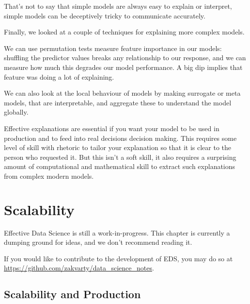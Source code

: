 \documentclass[
  letterpaper,
  DIV=11,
  numbers=noendperiod]{scrreprt}
\begin{document}
That's not to say that simple models are always easy to explain or
interpret, simple models can be deceptively tricky to communicate
accurately.

Finally, we looked at a couple of techniques for explaining more complex
models.

We can use permutation tests measure feature importance in our models:
shuffling the predictor values breaks any relationship to our response,
and we can measure how much this degrades our model performance. A big
dip implies that feature was doing a lot of explaining.

We can also look at the local behaviour of models by making surrogate or
meta models, that are interpretable, and aggregate these to understand
the model globally.

Effective explanations are essential if you want your model to be used
in production and to feed into real decisions decision making. This
requires some level of skill with rhetoric to tailor your explanation so
that it is clear to the person who requested it. But this isn't a soft
skill, it also requires a surprising amount of computational and
mathematical skill to extract such explanations from complex modern
models.

\chapter{Scalability}\label{production-scalability}

\begin{tcolorbox}[enhanced jigsaw, leftrule=.75mm, bottomtitle=1mm, toprule=.15mm, colbacktitle=quarto-callout-important-color!10!white, breakable, colback=white, bottomrule=.15mm, opacityback=0, colframe=quarto-callout-important-color-frame, title=\textcolor{quarto-callout-important-color}{\faExclamation}\hspace{0.5em}{Important}, titlerule=0mm, toptitle=1mm, opacitybacktitle=0.6, arc=.35mm, rightrule=.15mm, coltitle=black, left=2mm]

Effective Data Science is still a work-in-progress. This chapter is
currently a dumping ground for ideas, and we don't recommend reading it.

If you would like to contribute to the development of EDS, you may do so
at \url{https://github.com/zakvarty/data_science_notes}.

\end{tcolorbox}

\section{Scalability and Production}\label{scalability-and-production}
\end{document}
